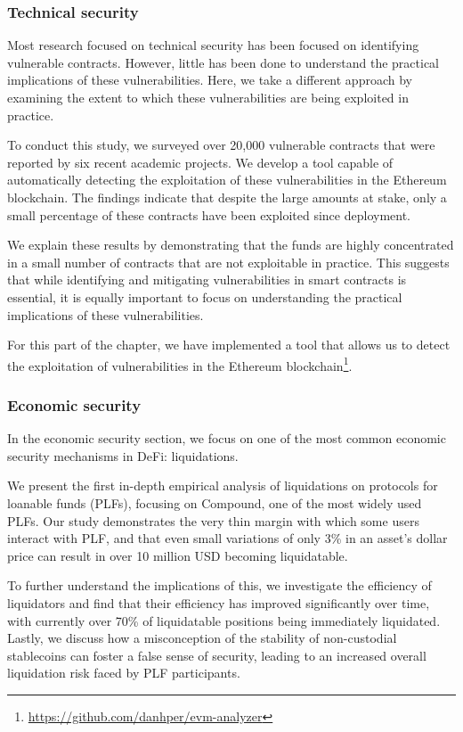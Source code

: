 \subsubsection{Technical security}

Most research focused on technical security has been focused on identifying vulnerable contracts.
However, little has been done to understand the practical implications of these vulnerabilities.
Here, we take a different approach by examining the extent to which these vulnerabilities are being exploited in practice.

To conduct this study, we surveyed over 20,000 vulnerable contracts that were reported by six recent academic projects.
We develop a tool capable of automatically detecting the exploitation of these vulnerabilities in the Ethereum blockchain.
The findings indicate that despite the large amounts at stake, only a small percentage of these contracts have been exploited since deployment.

We explain these results by demonstrating that the funds are highly concentrated in a small number of contracts that are not exploitable in practice.
This suggests that while identifying and mitigating vulnerabilities in smart contracts is essential, it is equally important to focus on understanding the practical implications of these vulnerabilities.

For this part of the chapter, we have implemented a tool that allows us to detect the exploitation of vulnerabilities in the Ethereum blockchain\footnote{\url{https://github.com/danhper/evm-analyzer}}.

\subsubsection{Economic security}
In the economic security section, we focus on one of the most common economic security mechanisms in DeFi: liquidations.

We present the first in-depth empirical analysis of liquidations on protocols for loanable funds (PLFs), focusing on Compound, one of the most widely used PLFs.
Our study demonstrates the very thin margin with which some users interact with PLF, and that even small variations of only 3\% in an asset's dollar price can result in over 10 million USD becoming liquidatable.

To further understand the implications of this, we investigate the efficiency of liquidators and find that their efficiency has improved significantly over time, with currently over 70\% of liquidatable positions being immediately liquidated.
Lastly, we discuss how a misconception of the stability of non-custodial stablecoins can foster a false sense of security, leading to an increased overall liquidation risk faced by PLF participants.

